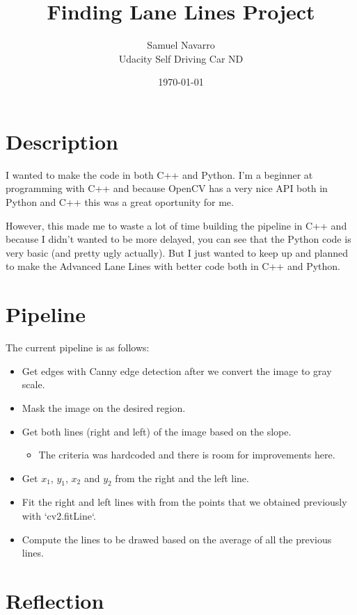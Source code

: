 \documentclass[11pt, a4paper]{article}
\begin{document}
\title{Finding Lane Lines Project}
\author{Samuel Navarro \\ Udacity Self Driving Car ND}
\date{\today}
\maketitle
	
	\section{Description}%
	\label{sec:description}

	I wanted to make the code in both C++ and Python. I'm a beginner at programming with C++ and because OpenCV has a very nice API both in Python and C++ this was a great oportunity for me.

	However, this made me to waste a lot of time building the pipeline in C++ and because I didn't wanted to be more delayed, you can see that the Python code is very basic (and pretty ugly actually). But I just wanted to keep up and planned to make the Advanced Lane Lines with better code both in C++ and Python.

	\section{Pipeline}%
	\label{sec:pipeline}
	The current pipeline is as follows:
	\begin{itemize}
		\item Get edges with Canny edge detection after we convert the image to gray scale.
		\item Mask the image on the desired region.
		\item Get both lines (right and left) of the image based on the slope. 
			\begin{itemize}
				\item The criteria was hardcoded and there is room for improvements here.
			\end{itemize}
		\item Get $x_1$, $y_1$, $x_2$ and $y_2$ from the right and the left line.
		\item Fit the right and left lines with from the points that we obtained previously with `cv2.fitLine`. 
		\item Compute the lines to be drawed based on the average of all the previous lines. 
	\end{itemize}

	\section{Reflection}%
	\label{sec:problems}
	
\end{document}
